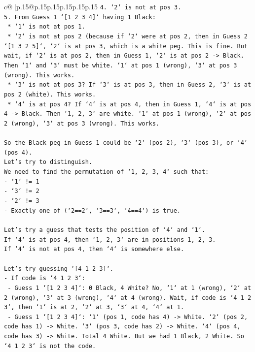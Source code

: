 \documentclass{article}
\begin{document}
{\begin{supertabular}{c@{$\;$}|p{.15\linewidth}@{}p{.15\linewidth}p{.15\linewidth}p{.15\linewidth}p{.15\linewidth}p{.15\linewidth}}
{{{\texttt{4.  `2` is not at pos 3.} \\
\texttt{5.  From Guess 1 `{[}1 2 3 4{]}` having 1 Black:} \\
\texttt{    *   `1` is not at pos 1.} \\
\texttt{    *   `2` is not at pos 2 (because if `2` were at pos 2, then in Guess 2 `{[}1 3 2 5{]}`, `2` is at pos 3, which is a white peg. This is fine. But wait, if `2` is at pos 2, then in Guess 1, `2` is at pos 2 {-}> Black. Then `1` and `3` must be white. `1` at pos 1 (wrong), `3` at pos 3 (wrong). This works.} \\
\texttt{    *   `3` is not at pos 3? If `3` is at pos 3, then in Guess 2, `3` is at pos 2 (white). This works.} \\
\texttt{    *   `4` is at pos 4? If `4` is at pos 4, then in Guess 1, `4` is at pos 4 {-}> Black. Then `1, 2, 3` are white. `1` at pos 1 (wrong), `2` at pos 2 (wrong), `3` at pos 3 (wrong). This works.} \\
\\ 
\texttt{So the Black peg in Guess 1 could be `2` (pos 2), `3` (pos 3), or `4` (pos 4).} \\
\texttt{Let's try to distinguish.} \\
\texttt{We need to find the permutation of `1, 2, 3, 4` such that:} \\
\texttt{{-} `1` != 1} \\
\texttt{{-} `3` != 2} \\
\texttt{{-} `2` != 3} \\
\texttt{{-} Exactly one of (`2==2`, `3==3`, `4==4`) is true.} \\
\\ 
\texttt{Let's try a guess that tests the position of `4` and `1`.} \\
\texttt{If `4` is at pos 4, then `1, 2, 3` are in positions 1, 2, 3.} \\
\texttt{If `4` is not at pos 4, then `4` is somewhere else.} \\
\\ 
\texttt{Let's try guessing `{[}4 1 2 3{]}`.} \\
\texttt{{-} If code is `4 1 2 3`:} \\
\texttt{    {-} Guess 1 `{[}1 2 3 4{]}`: 0 Black, 4 White? No, `1` at 1 (wrong), `2` at 2 (wrong), `3` at 3 (wrong), `4` at 4 (wrong). Wait, if code is `4 1 2 3`, then `1` is at 2, `2` at 3, `3` at 4, `4` at 1.} \\
\texttt{    {-} Guess 1 `{[}1 2 3 4{]}`: `1` (pos 1, code has 4) {-}> White. `2` (pos 2, code has 1) {-}> White. `3` (pos 3, code has 2) {-}> White. `4` (pos 4, code has 3) {-}> White. Total 4 White. But we had 1 Black, 2 White. So `4 1 2 3` is not the code.} \\
}}}
\end{supertabular}}
\end{document}
